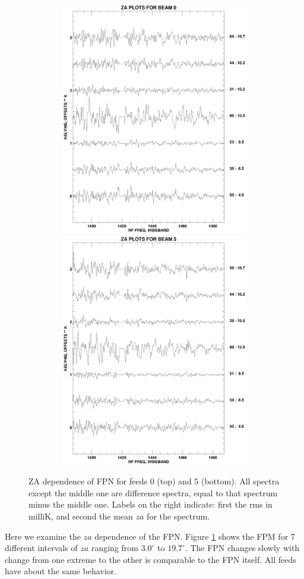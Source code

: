 \documentclass[psfig,preprint]{aastex}
\begin{document}
\begin{figure}[!p]
\begin{center}
\includegraphics[width=6in, height=4in]{zmmplot0.ps}   
\includegraphics[width=6in, height=4in]{zmmplot5.ps}   
\end{center}
\caption{ZA dependence of FPN for feeds 0 (top) and 5 (bottom). All
spectra except the middle one are difference spectra, equal to that
spectrum minus the middle one. Labels on the right
indicate: first the rms in milliK, and second the mean $za$ for the spectrum.
\label{zmm05}}
\end{figure}

	Here we examine the $za$ dependence of the FPN.  Figure
\ref{zmm05} shows the FPM for 7 different intervals of $za$ ranging from
$3.0^\circ$ to $19.7^\circ$.  The FPN changes slowly with %
change from one extreme to the other is comparable to the FPN itself. 
All feeds have about the same behavior. 
\end{document}
